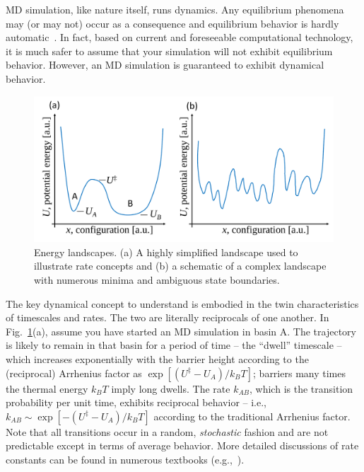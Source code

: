\documentclass[9pt,bestpractices]{livecoms}
\begin{document}
MD simulation, like nature itself, runs dynamics.  
Any equilibrium phenomena may (or may not) occur as a consequence and equilibrium behavior is hardly automatic~\cite{Zuckerman:2010:}.  
In fact, based on current and foreseeable computational technology, it is much safer to assume that your simulation will not exhibit equilibrium behavior.  
However, an MD simulation is guaranteed to exhibit dynamical behavior.

\begin{figure}[h]
\centering
\includegraphics[width=\linewidth]{simplelandscapes.pdf}
\caption{Energy landscapes.  (a) A highly simplified landscape used to illustrate rate concepts and (b) a schematic of a complex landscape with numerous minima and ambiguous state boundaries.}
\label{landscapes}
\end{figure}

The key dynamical concept to understand is embodied in the twin characteristics of timescales and rates.  
The two are literally reciprocals of one another.  
In Fig.\ \ref{landscapes}(a), assume you have started an MD simulation in basin A.  
The trajectory is likely to remain in that basin for a period of time -- the ``dwell'' timescale -- which increases exponentially with the barrier height according to the (reciprocal) Arrhenius factor as $\exp[(U^\ddagger - U_A)/k_B T]$; barriers many times the thermal energy $k_BT$ imply long dwells.  
The rate $k_{AB}$, which is the transition probability per unit time, exhibits reciprocal behavior -- i.e., $k_{AB} \sim \exp[-(U^\ddagger - U_A)/k_B T]$ according to the traditional Arrhenius factor.  
Note that all transitions occur in a random, \emph{stochastic} fashion and are not predictable except in terms of average behavior.  
More detailed discussions of rate constants can be found in numerous textbooks (e.g.,~\cite{DillBook, Zuckerman:2010:}).
\end{document}
